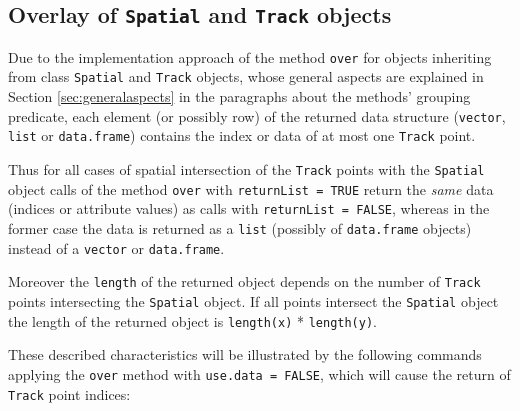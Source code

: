 \documentclass[12pt, oneside, a4paper]{scrbook}
\let\code=\texttt
\newcommand{\codeintitles}[1]{{\tt #1}} %
\begin{document}
\subsection{Overlay of \codeintitles{Spatial} and \codeintitles{Track} objects}
\label{subsec:overlayofspatial}


Due to the implementation approach of the method \code{over} for objects inheriting from class \code{Spatial} and \code{Track} objects, whose general aspects are explained in Section \ref{sec:generalaspects} in the paragraphs about the methods' grouping predicate, each element (or possibly row) of the returned data structure (\code{vector}, \code{list} or \code{data.frame}) contains the index or data of at most one \code{Track} point.
\par\medskip
Thus for all cases of spatial intersection of the \code{Track} points with the \code{Spatial} object calls of the method \code{over} with \code{returnList = TRUE} return the \textit{same} data (indices or attribute values) as calls with \code{returnList = FALSE}, whereas in the former case the data is returned as a \code{list} (possibly of \code{data.frame} objects) instead of a \code{vector} or \code{data.frame}.
\par\medskip
Moreover the \code{length} of the returned object depends on the number of \code{Track} points intersecting the \code{Spatial} object. If all points intersect the \code{Spatial} object the length of the returned object is \code{length(x)} * \code{length(y)}.
\par\medskip
These described characteristics will be illustrated by the following commands applying the \code{over} method with \code{use.data = FALSE}, which will cause the return of \code{Track} point indices:
\end{document}
